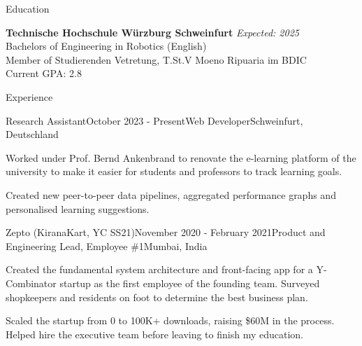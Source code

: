 \documentclass[
	a4paper, %
	11pt, %
]{resume} %
\begin{document}

\begin{rSection}{Education}

	\textbf{Technische Hochschule Würzburg Schweinfurt} \hfill \textit{Expected: 2025} \\
	Bachelors of Engineering in Robotics (English) \\
	Member of Studierenden Vetretung, T.St.V Moeno Ripuaria im BDIC \\
	Current GPA: 2.8

\end{rSection}


\begin{rSection}{Experience}

	\begin{rSubsection}{Research Assistant}{October 2023 - Present}{Web Developer}{Schweinfurt, Deutschland}
		\item Worked under Prof. Bernd Ankenbrand to renovate the e-learning platform of the university to make it easier for students and professors to track learning goals.
		\item Created new peer-to-peer data pipelines, aggregated performance graphs and personalised learning suggestions.
	\end{rSubsection}


	\begin{rSubsection}{Zepto (KiranaKart, YC SS21)}{November 2020 - February 2021}{Product and Engineering Lead, Employee \#1}{Mumbai, India}
		\item Created the fundamental system architecture and front-facing app for a Y-Combinator startup as the first employee of the founding team. Surveyed shopkeepers and residents on foot to determine the best business plan.
		\item Scaled the startup from 0 to 100K+ downloads, raising \$60M in the process. Helped hire the executive team before leaving to finish my education.
	\end{rSubsection}

\end{rSection}
\end{document}
